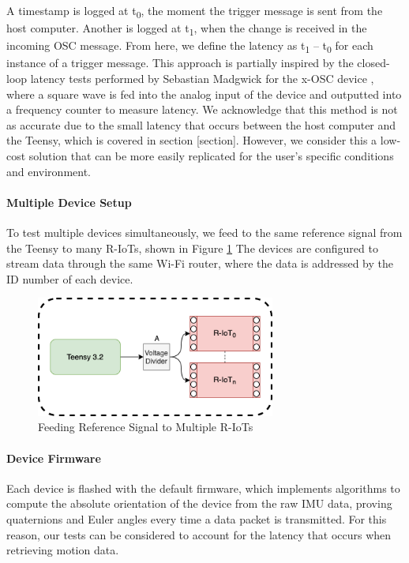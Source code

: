 A timestamp is logged at t\textsubscript{0}, the moment the trigger message is sent from the host computer. Another is logged at t\textsubscript{1}, when the change is received in the incoming OSC message. From here, we define the latency as t\textsubscript{1} – t\textsubscript{0} for each instance of a trigger message. This approach is partially inspired by the closed-loop latency tests performed by Sebastian Madgwick for the x-OSC device \cite{madgwick_x-osc_2013}, where a square wave is fed into the analog input of the device and outputted into a frequency counter to measure latency. We acknowledge that this method is not as accurate due to the small latency that occurs between the host computer and the Teensy, which is covered in section [section]. However, we consider this a low-cost solution that can be more easily replicated for the user’s specific conditions and environment.

\paragraph{Multiple Device Setup}
To test multiple devices simultaneously, we feed to the same reference signal from the Teensy to many R-IoTs, shown in Figure \ref{fig:latency_fig2} The devices are configured to stream data through the same Wi-Fi router, where the data is addressed by the ID number of each device.

\begin{figure}[htbp]
  \centering
    \includegraphics[width=0.7\textwidth]{Chapters/Figures/technical/Latency/figure2.png}
    \caption{Feeding Reference Signal to Multiple R-IoTs}
    \label{fig:latency_fig2}
\end{figure}

\paragraph{Device Firmware}
Each device is flashed with the default firmware, which implements algorithms to compute the absolute orientation of the device from the raw IMU data, proving quaternions and Euler angles every time a data packet is transmitted. For this reason, our tests can be considered to account for the latency that occurs when retrieving motion data.

